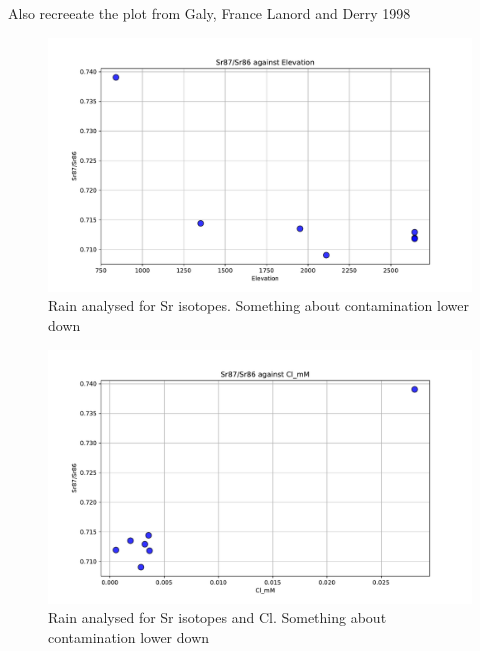 Also recreeate the plot from Galy, France Lanord and Derry 1998

\begin{figure}[h]
    \centering
    \includegraphics[width=\textwidth]{Sr87_Sr86_Elevation.pdf}
    \caption{Rain analysed for Sr isotopes. Something about contamination lower down}
    \label{fig:discussion1}
\end{figure}

\FloatBarrier


\begin{figure}[h]
    \centering
    \includegraphics[width=\textwidth]{Sr87_Sr86_Cl.pdf}
    \caption{Rain analysed for Sr isotopes and Cl. Something about contamination lower down}
    \label{fig:discussion2}
\end{figure}

\FloatBarrier



